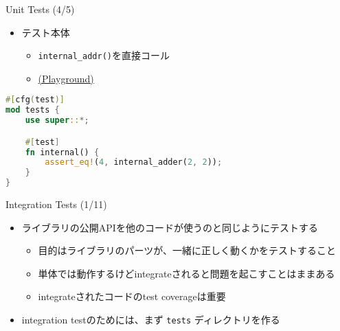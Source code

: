 \documentclass[cjk,14pt,xcolor=dvipsnames,table,dvipdfmx,professional font,t,fragile]{beamer}
\newenvironment{commandline}%
{\VerbatimEnvironment
  \begin{Sbox}\begin{minipage}{0.9\hsize}\begin{fontsize}{8}{8} \color{white} \begin{BVerbatim}}%
{\end{BVerbatim}\end{fontsize}\end{minipage}\end{Sbox}
  \setlength{\fboxsep}{8pt}

\vspace{6pt}%
\fcolorbox{white}{black}{\TheSbox}

\vspace{3pt}%
}
\begin{document}
\begin{frame}[fragile]{Unit Tests (4/5)}
 \begin{itemize}
  \item テスト本体
	\begin{itemize}
	 \item \verb|internal_addr()|を直接コール
	 \item \href{https://play.rust-lang.org/?version=stable&mode=debug&edition=2018&gist=0d970a840ec7a82730e9a9d71d142e14}
	       {(Playground)}
	\end{itemize}
 \end{itemize}
 {\scriptsize
 \begin{lstlisting}[language=Rust,style=boxed,style=colouredRust]
#[cfg(test)]
mod tests {
    use super::*;

    #[test]
    fn internal() {
        assert_eq!(4, internal_adder(2, 2));
    }
}\end{lstlisting}}
\end{frame}


\begin{frame}[fragile]{Integration Tests (1/11)}
 \begin{itemize}
  \item ライブラリの公開APIを他のコードが使うのと同じようにテストする
	\begin{itemize}
	 \item 目的はライブラリのパーツが、一緒に正しく動くかをテストすること
	 \item 単体では動作するけどintegrateされると問題を起こすことはままある
	 \item integrateされたコードのtest coverageは重要
	\end{itemize}
  \item integration testのためには、まず \texttt{tests} ディレクトリを作る
 \end{itemize}
\end{frame}
\end{document}
